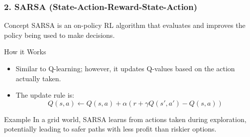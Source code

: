 \documentclass{beamer}
\begin{document}
\begin{frame}[fragile]
    \frametitle{2. SARSA (State-Action-Reward-State-Action)}
    \begin{block}{Concept}
        SARSA is an on-policy RL algorithm that evaluates and improves the policy being used to make decisions.
    \end{block}

    \begin{block}{How it Works}
        \begin{itemize}
            \item Similar to Q-learning; however, it updates Q-values based on the action actually taken.
            \item The update rule is:
            \begin{equation}
            Q(s, a) \gets Q(s, a) + \alpha \left( r + \gamma Q(s', a') - Q(s, a) \right)
            \end{equation}
        \end{itemize}
    \end{block}

    \begin{block}{Example}
        In a grid world, SARSA learns from actions taken during exploration, potentially leading to safer paths with less profit than riskier options.
    \end{block}
\end{frame}
\end{document}

